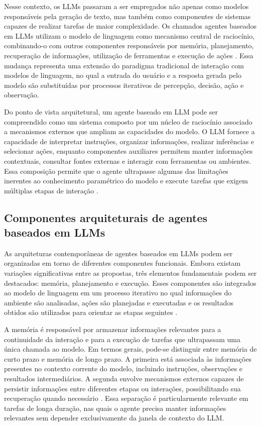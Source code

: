 Nesse contexto, os LLMs passaram a ser empregados não apenas como modelos responsáveis pela geração de texto, mas também como componentes de sistemas capazes de realizar tarefas de maior complexidade. Os chamados agentes baseados em LLMs utilizam o modelo de linguagem como mecanismo central de raciocínio, combinando-o com outros componentes responsáveis por memória, planejamento, recuperação de informações, utilização de ferramentas e execução de ações \cite{cheng2026,zhao2023survey}. Essa mudança representa uma extensão do paradigma tradicional de interação com modelos de linguagem, no qual a entrada do usuário e a resposta gerada pelo modelo são substituídas por processos iterativos de percepção, decisão, ação e observação.

Do ponto de vista arquitetural, um agente baseado em LLM pode ser compreendido como um sistema composto por um núcleo de raciocínio associado a mecanismos externos que ampliam as capacidades do modelo. O LLM fornece a capacidade de interpretar instruções, organizar informações, realizar inferências e selecionar ações, enquanto componentes auxiliares permitem manter informações contextuais, consultar fontes externas e interagir com ferramentas ou ambientes. Essa composição permite que o agente ultrapasse algumas das limitações inerentes ao conhecimento paramétrico do modelo e execute tarefas que exigem múltiplas etapas de interação \cite{cheng2026,zhao2023survey}.

\subsection{Componentes arquiteturais de agentes baseados em LLMs}

As arquiteturas contemporâneas de agentes baseados em LLMs podem ser organizadas em torno de diferentes componentes funcionais. Embora existam variações significativas entre as propostas, três elementos fundamentais podem ser destacados: memória, planejamento e execução. Esses componentes são integrados ao modelo de linguagem em um processo iterativo no qual informações do ambiente são analisadas, ações são planejadas e executadas e os resultados obtidos são utilizados para orientar as etapas seguintes \cite{cheng2026,zhao2023survey}.

A memória é responsável por armazenar informações relevantes para a continuidade da interação e para a execução de tarefas que ultrapassam uma única chamada ao modelo. Em termos gerais, pode-se distinguir entre memória de curto prazo e memória de longo prazo. A primeira está associada às informações presentes no contexto corrente do modelo, incluindo instruções, observações e resultados intermediários. A segunda envolve mecanismos externos capazes de persistir informações entre diferentes etapas ou interações, possibilitando sua recuperação quando necessário \cite{zhao2023survey}. Essa separação é particularmente relevante em tarefas de longa duração, nas quais o agente precisa manter informações relevantes sem depender exclusivamente da janela de contexto do LLM.

